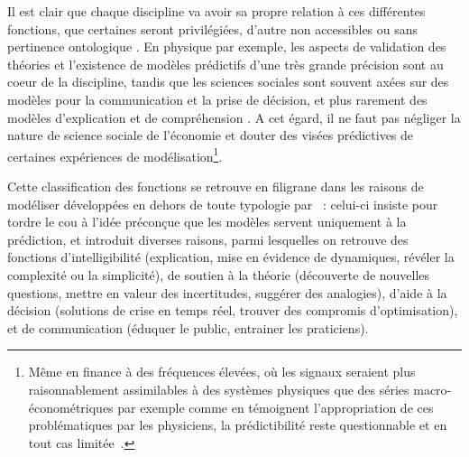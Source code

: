 Il est clair que chaque discipline va avoir sa propre relation à ces différentes fonctions, que certaines seront privilégiées, d'autre non accessibles ou sans pertinence ontologique . En physique par exemple, les aspects de validation des théories et l'existence de modèles prédictifs d'une très grande précision sont au coeur de la discipline, tandis que les sciences sociales sont souvent axées sur des modèles pour la communication et la prise de décision, et plus rarement des modèles d'explication et de compréhension . A cet égard, il ne faut pas négliger la nature de science sociale de l'économie et douter des visées prédictives de certaines expériences de modélisation\footnote{Même en finance à des fréquences élevées, où les signaux seraient plus raisonnablement assimilables à des systèmes physiques que des séries macro-économétriques par exemple comme en témoignent l'appropriation de ces problématiques par les physiciens, la prédictibilité reste questionnable et en tout cas limitée~\cite{campbell2007predicting}.}. 


Cette classification des fonctions se retrouve en filigrane dans les raisons de modéliser développées en dehors de toute typologie par~\cite{epstein2008model} : celui-ci insiste pour tordre le cou à l'idée préconçue que les modèles servent uniquement à la prédiction, et introduit diverses raisons, parmi lesquelles on retrouve des fonctions d'intelligibilité (explication, mise en évidence de dynamiques, révéler la complexité ou la simplicité), de soutien à la théorie (découverte de nouvelles questions, mettre en valeur des incertitudes, suggérer des analogies), d'aide à la décision (solutions de crise en temps réel, trouver des compromis d'optimisation), et de communication (éduquer le public, entrainer les praticiens). 

